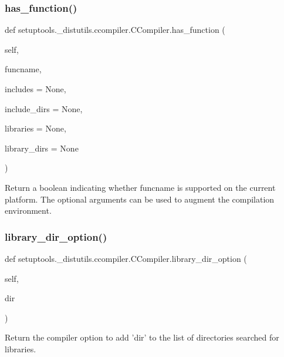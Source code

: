 \subsubsection{\texorpdfstring{has\+\_\+function()}{has\_function()}}
{\footnotesize\ttfamily def setuptools.\+\_\+distutils.\+ccompiler.\+C\+Compiler.\+has\+\_\+function (\begin{DoxyParamCaption}\item[{}]{self,  }\item[{}]{funcname,  }\item[{}]{includes = {\ttfamily None},  }\item[{}]{include\+\_\+dirs = {\ttfamily None},  }\item[{}]{libraries = {\ttfamily None},  }\item[{}]{library\+\_\+dirs = {\ttfamily None} }\end{DoxyParamCaption})}

\begin{DoxyVerb}Return a boolean indicating whether funcname is supported on
the current platform.  The optional arguments can be used to
augment the compilation environment.
\end{DoxyVerb}
 \mbox{\label{classsetuptools_1_1__distutils_1_1ccompiler_1_1CCompiler_a3f4e9315193723a24eb4d021d3cda16e}} 
\subsubsection{\texorpdfstring{library\+\_\+dir\+\_\+option()}{library\_dir\_option()}}
{\footnotesize\ttfamily def setuptools.\+\_\+distutils.\+ccompiler.\+C\+Compiler.\+library\+\_\+dir\+\_\+option (\begin{DoxyParamCaption}\item[{}]{self,  }\item[{}]{dir }\end{DoxyParamCaption})}

\begin{DoxyVerb}Return the compiler option to add 'dir' to the list of
directories searched for libraries.
\end{DoxyVerb}
 \mbox{\label{classsetuptools_1_1__distutils_1_1ccompiler_1_1CCompiler_a8e7dc497b0dbe3321ea2b28bc7f90302}} 
